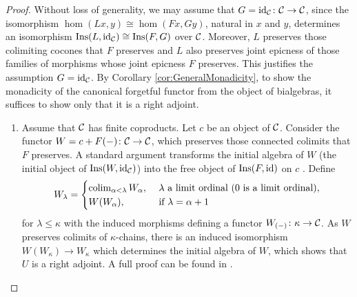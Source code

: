 \begin{proof}
Without loss of generality, we may assume that $G = \mathrm{id}_{\mathcal{C}}\colon\mathcal{C}\to \mathcal{C}$, since the isomorphism $\hom(Lx,y)\cong \hom(Fx,Gy)$, natural in $x$ and $y$, determines an isomorphism $\mathrm{Ins}(L,\mathrm{id}_{\mathcal{C}})\cong \mathrm{Ins}(F,G)$ over $\mathcal{C}$. Moreover, $L$ preserves those colimiting cocones that $F$ preserves and $L$ also preserves joint epicness of those families of morphisms whose joint epicness $F$ preserves. This justifies the assumption $G = \mathrm{id}_{\mathcal{C}}$. By Corollary \ref{cor:GeneralMonadicity}, to show the monadicity of the canonical forgetful functor from the object of bialgebras, it suffices to show only that it is a right adjoint.
\begin{enumerate}
    \item Assume that $\mathcal{C}$ has finite coproducts. Let $c$ be an object of $\mathcal{C}$. Consider the functor $W = c+F(-)\colon \mathcal{C}\to \mathcal{C}$, which preserves those connected colimits that $F$ preserves. A standard argument transforms the initial algebra of $W$ (the initial object of $\mathrm{Ins}(W,\mathrm{id}_{\mathcal{C}})$) into the free object of $\mathrm{Ins}(F,\mathrm{id})$ on $c$ \cite{Adamek1974}. Define
    $$
    W_{\lambda} = \begin{cases}
            \operatorname*{colim}_{\alpha<\lambda}W_{\alpha}, &\text{ $\lambda$ a limit ordinal (0 is a limit ordinal)},\\
        W(W_\alpha), &\text{ if $\lambda = \alpha +1$}
    \end{cases}
    $$
    for $\lambda\leq \kappa$ with the induced morphisms defining a functor $W_{(-)}\colon \kappa\to \mathcal{C}$. As $W$ preserves colimits of $\kappa$-chains, there is an induced isomorphism $W(W_\kappa)\to W_\kappa$ which determines the initial algebra of $W$, which shows that $U$ is a right adjoint. A full proof can be found in \cite{Adamek1974}.


\end{enumerate}
\end{proof}
